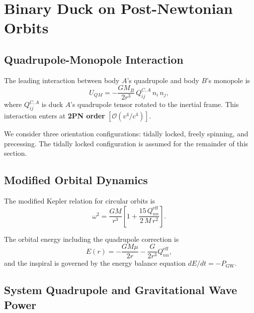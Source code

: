 \documentclass[aps,prd,twocolumn,superscriptaddress,nofootinbib]{revtex4-2}
\newcommand{\order}[1]{\mathcal{O}(#1)}
\begin{document}
\section{Binary Duck on Post-Newtonian Orbits}
\label{sec:binary}

\subsection{Quadrupole-Monopole Interaction}
\label{sec:QM_interaction}

The leading interaction between body $A$'s quadrupole and body $B$'s
monopole is~\cite{PoissonWill2014, BarkerOConnell1975}
\begin{equation}
U_{QM} = -\frac{G M_B}{2 r^3}\, Q^{C,A}_{ij}\, n_i\, n_j,
\label{eq:UQM}
\end{equation}
where $Q^{C,A}_{ij}$ is duck $A$'s quadrupole tensor rotated to the
inertial frame.
This interaction enters at \textbf{2PN order} $[\order{v^4/c^4}]$.

We consider three orientation configurations: tidally locked, freely
spinning, and precessing.
The tidally locked configuration is assumed for the remainder of this
section.


\subsection{Modified Orbital Dynamics}
\label{sec:modified_kepler}

The modified Kepler relation for circular orbits is
\begin{equation}
\omega^2 = \frac{G M}{r^3}\left[1 + \frac{15\, Q_{nn}^{\mathrm{eff}}}
{2\, M\, r^2}\right].
\label{eq:mod_kepler}
\end{equation}

The orbital energy including the quadrupole correction is
\begin{equation}
E(r) = -\frac{G M \mu}{2r} - \frac{G}{2r^3} Q_{nn}^{\mathrm{eff}},
\label{eq:E_orb}
\end{equation}
and the inspiral is governed by the energy balance equation
$dE/dt = -P_{\mathrm{GW}}$.


\subsection{System Quadrupole and Gravitational Wave Power}
\label{sec:gw_power}
\end{document}
